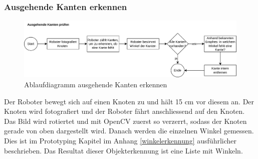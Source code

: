 \subsubsection{Ausgehende Kanten erkennen}

\begin{figure}[H]
\centering
\includegraphics[width=\textwidth]{assets/gesamtkonzept/ablaufdiagramm-kanten-erkennen.png}
\caption{Ablaufdiagramm ausgehende Kanten erkennen}
\label{fig:ablaufdiagramm-kanten-erkennen}
\end{figure}

Der Roboter bewegt sich auf einen Knoten zu und hält 15 cm vor diesem an. Der Knoten wird fotografiert und der Roboter fährt anschliessend auf den Knoten. Das Bild wird rotiertet und mit OpenCV zuerst so verzerrt, sodass der Knoten gerade von oben dargestellt wird. Danach werden die einzelnen Winkel gemessen. Dies ist im Prototyping Kapitel im Anhang \ref{winkelerkennung} ausführlicher beschrieben. Das Resultat dieser Objekterkennung ist eine Liste mit Winkeln.

